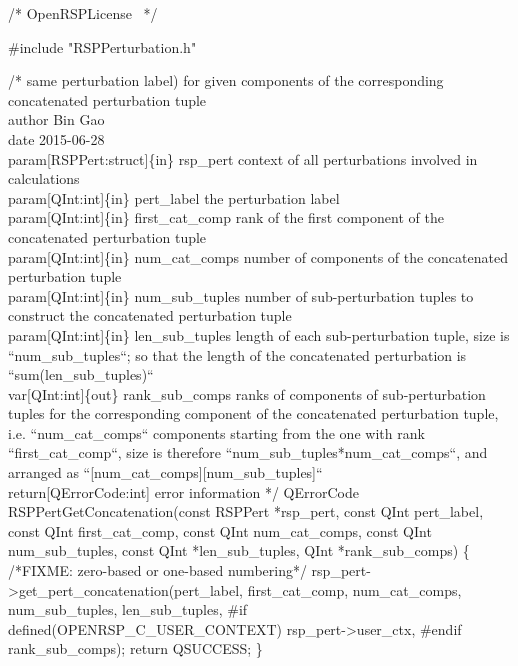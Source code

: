 \nwendcode{}\endmoddef
/*
  \LA{}OpenRSPLicense~{\nwtagstyle{}}\RA{}
*/

#include "RSPPerturbation.h"

/*%
        same perturbation label) for given components of the corresponding
        concatenated perturbation tuple
    \\author Bin Gao
    \\date 2015-06-28
    \\param[RSPPert:struct]\{in\} rsp_pert context of all perturbations involved
        in calculations
    \\param[QInt:int]\{in\} pert_label the perturbation label
    \\param[QInt:int]\{in\} first_cat_comp rank of the first component of the
        concatenated perturbation tuple
    \\param[QInt:int]\{in\} num_cat_comps number of components of the concatenated
        perturbation tuple
    \\param[QInt:int]\{in\} num_sub_tuples number of sub-perturbation tuples to
        construct the concatenated perturbation tuple
    \\param[QInt:int]\{in\} len_sub_tuples length of each sub-perturbation tuple,
        size is ``num_sub_tuples``; so that the length of the concatenated
        perturbation is ``sum(len_sub_tuples)``
    \\var[QInt:int]\{out\} rank_sub_comps ranks of components of sub-perturbation
        tuples for the corresponding component of the concatenated perturbation
        tuple, i.e. ``num_cat_comps`` components starting from the one with rank
        ``first_cat_comp``, size is therefore ``num_sub_tuples*num_cat_comps``,
        and arranged as ``[num_cat_comps][num_sub_tuples]``
    \\return[QErrorCode:int] error information
*/
QErrorCode RSPPertGetConcatenation(const RSPPert *rsp_pert,
                                   const QInt pert_label,
                                   const QInt first_cat_comp,
                                   const QInt num_cat_comps,
                                   const QInt num_sub_tuples,
                                   const QInt *len_sub_tuples,
                                   QInt *rank_sub_comps)
\{
/*FIXME: zero-based or one-based numbering*/
    rsp_pert->get_pert_concatenation(pert_label,
                                     first_cat_comp,
                                     num_cat_comps,
                                     num_sub_tuples,
                                     len_sub_tuples,
#if defined(OPENRSP_C_USER_CONTEXT)
                                     rsp_pert->user_ctx,
#endif
                                     rank_sub_comps);
    return QSUCCESS;
\}

